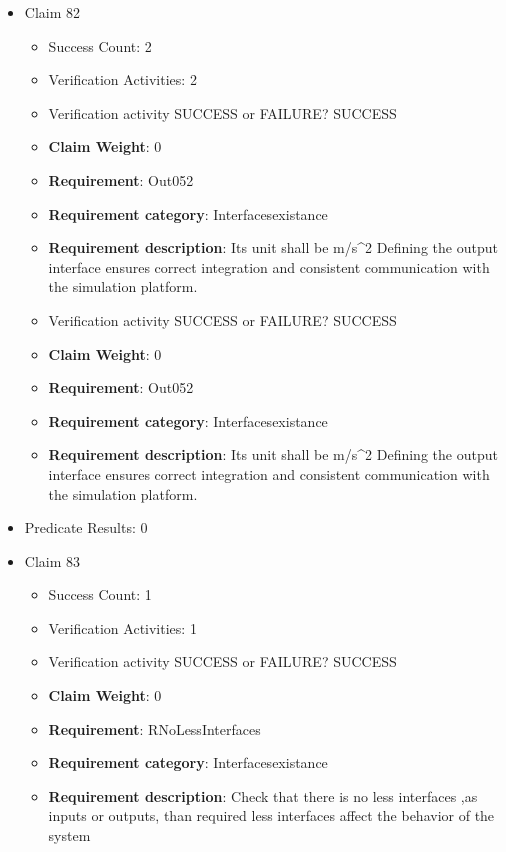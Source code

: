 \documentclass{article}
\begin{document}
\begin{itemize}
  				  \item Claim 82
				\begin{itemize}
			    	\item Success Count: 2 
			    	\item Verification Activities: 2
					\item Verification activity SUCCESS or FAILURE? SUCCESS
					\item \textbf{Claim Weight}: 0
						\item \textbf{Requirement}: Out052 
						\item \textbf{Requirement category}: Interfacesexistance 
						\item \textbf{Requirement description}: Its unit shall be m/s^2 Defining the output interface ensures correct integration and consistent communication with the simulation platform.
					
					\item Verification activity SUCCESS or FAILURE? SUCCESS
					\item \textbf{Claim Weight}: 0
						\item \textbf{Requirement}: Out052 
						\item \textbf{Requirement category}: Interfacesexistance 
						\item \textbf{Requirement description}: Its unit shall be m/s^2 Defining the output interface ensures correct integration and consistent communication with the simulation platform.
					
				\end{itemize}
				
									    
				\item Predicate Results: 0

  				  \item Claim 83
				\begin{itemize}
			    	\item Success Count: 1 
			    	\item Verification Activities: 1
					\item Verification activity SUCCESS or FAILURE? SUCCESS
					\item \textbf{Claim Weight}: 0
						\item \textbf{Requirement}: RNoLessInterfaces 
						\item \textbf{Requirement category}: Interfacesexistance 
						\item \textbf{Requirement description}: Check that there is no less interfaces ,as inputs or outputs, than required  less interfaces affect the behavior of the system
					

\end{itemize}
\end{itemize}
\end{document}
